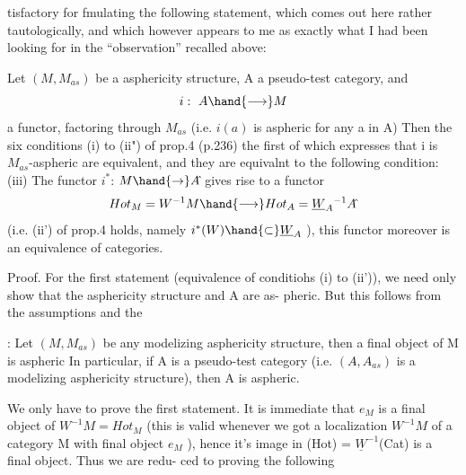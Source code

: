tisfactory for fmulating the following statement,  which comes out here
rather tautologically,  and which however appears to me as exactly what
I had been looking for in the ``observation'' recalled above:

 Let $(M,M_{as})$  be a \hand{\uline{\textcolor{black}{modelizing}}} asphericity structure,   A a
 pseudo-test category,  and
\[ i:\ A \hand{\longrightarrow} M \]
a functor,  factoring through $M_{as}$  (i.e. $i(a)$ is aspheric for any a in A)
Then the six conditions (i) to (ii") of prop.4  (p.236)\hand{,} \hand{(}the first
of which expresses that i is $M_{as}$-aspheric\hand{)} are equivalent,  and they are
equivalnt to the following condition:
  (iii)  The functor  $i^{*}$: $M \hand{\to} A\hat{}$ gives rise to a functor
\[ Hot_M = W^{-1}M \hand{\longrightarrow} Hot_A = \underline{W}_A{}^{-1}A\hat{} \]
(i.e.  (ii') of prop.4 holds,  namely  $i^{*}(W) \hand{\subset} \underline{W}_A$ ),  \hand{\uline{\textcolor{black}{and}}}  this functor
moreover is an equivalence of categories.

Proof.  For the first statement (equivalence of conditiohs (i) to
(ii')),  we need only show that the asphericity structure  and A are as-%
pheric.  But  this follows from the assumptions and  the

\hand{\uline{\textcolor{black}{Lemma}}} : Let $(M,M_{as})$  be any modelizing asphericity structure,  then a
final object of M is aspheric In particular,  if A is a pseudo-test
category (i.e.  $(A\hat{},A\hat{}_{as})$  is a modelizing asphericity structure),  then A
is aspheric.

We only have to prove the first statement.   It is immediate
that $e_M$  is a final object of $W^{-1}M = Hot_M$  (this is valid whenever we
got a localization $W^{-1}M$  of a category M with final object $e_M$ ),  hence
it's image in (Hot) = $\underline{W}^{-1}$(Cat)  is a final object.  Thus we are redu-%
ced to proving the following

